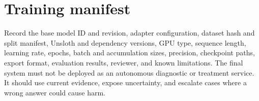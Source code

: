 \documentclass[11pt,oneside]{book}
\begin{document}
\section{Training manifest}

Record the base model ID and revision, adapter configuration, dataset hash and split manifest, Unsloth and dependency versions, GPU type, sequence length, learning rate, epochs, batch and accumulation sizes, precision, checkpoint paths, export format, evaluation results, reviewer, and known limitations. The final system must not be deployed as an autonomous diagnostic or treatment service. It should use current evidence, expose uncertainty, and escalate cases where a wrong answer could cause harm.

\backmatter
\begingroup
\sloppy
\raggedright
\renewcommand{\bibname}{Bibliography}
{}
\end{document}
